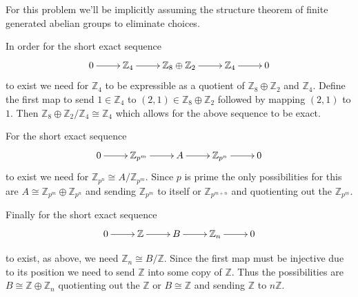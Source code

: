 \documentclass[10pt]{article}
\newcommand{\sk}{\vskip 2mm}
\newcommand{\bb}[1]{\mathbb{#1}}
\theoremstyle{plain}
\theoremstyle{remark}
\begin{document}
For this problem we'll be implicitly assuming the structure theorem of finite
generated abelian groups to eliminate choices.


In order for the short exact sequence
\[
  \xymatrix{0 \ar[r] & \bb{Z}_4 \ar[r] & \bb{Z}_8\oplus \bb{Z}_2\ar[r] &\bb{Z}_4 \ar[r] & 0}
\]
to exist we need for $\bb{Z}_4$ to be expressible as a quotient of
$\bb{Z}_8\oplus \bb{Z}_2$ and $\bb{Z}_4$. Define the first map to send
$1\in\bb{Z}_4$ to $(2,1)\in\bb{Z}_8\oplus\bb{Z}_2$ followed by mapping $(2,1)$ to $1$.
Then $\bb{Z}_8\oplus\bb{Z}_2/\bb{Z}_4\cong\bb{Z}_4$ which allows for the above sequence
to be exact.

For the short exact sequence
\[
  \xymatrix{0 \ar[r] & \bb{Z}_{p^m} \ar[r] & A \ar[r] & \bb{Z}_{p^n}\ar[r] & 0}
\]
to exist we need for $\bb{Z}_{p^n}\cong A/\bb{Z}_{p^m}$. Since $p$ is prime the
only possibilities for this are $A\cong \bb{Z}_{p^m}\oplus\bb{Z}_{p^n}$ and sending
$\bb{Z}_{p^m}$ to itself or $\bb{Z}_{p^{m+n}}$ and quotienting out the $\bb{Z}_{p^m}$.


Finally for the short exact sequence
\[
  \xymatrix{0 \ar[r] & \bb{Z} \ar[r] & B \ar[r] & \bb{Z}_n\ar[r] & 0}
\]

to exist, as above, we need $\bb{Z}_n\cong B/\bb{Z}$. Since the first map
must be injective due to its position we need to send $\bb{Z}$ into
some copy of $\bb{Z}$. Thus the possibilities are $B\cong \bb{Z}\oplus\bb{Z}_n$
quotienting out the $\bb{Z}$ or $B\cong\bb{Z}$ and sending $\bb{Z}$ to $n\bb{Z}$.

\sk

\end{document}
